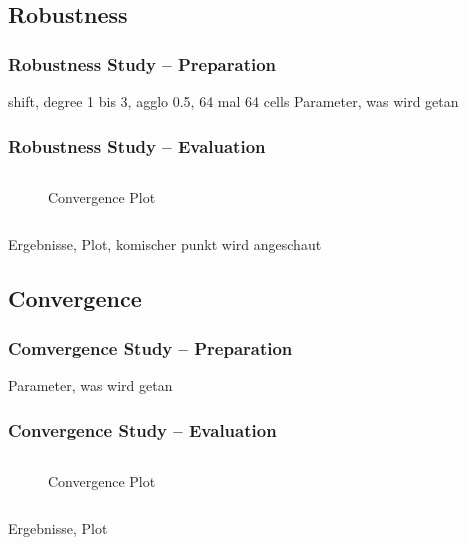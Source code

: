 	\subsection{Robustness}
	\begin{frame}
		\frametitle{Robustness Study -- Preparation}
		shift, degree 1 bis 3, agglo 0.5, 64 mal 64 cells
		Parameter, was wird getan
	\end{frame}
	\begin{frame}
		\frametitle{Robustness Study -- Evaluation}
		\begin{columns}[t]
	\column[]{4cm}
	\column[]{8cm}
			\begin{figure}[htp]	
				\vspace{-1cm}
				\centering
				
				\caption{Convergence Plot}
				\label{shifterror}
			\end{figure}
		\end{columns}
		Ergebnisse, Plot, komischer punkt wird angeschaut
	\end{frame}
	\subsection{Convergence}
	\begin{frame}
		\frametitle{Comvergence Study -- Preparation}
		Parameter, was wird getan
	\end{frame}
	\begin{frame}
		\frametitle{Convergence Study -- Evaluation}
		\begin{columns}[t]
			\column[]{4cm}
			\column[]{8cm}
		\begin{figure}[htp]
			\vspace{-1cm}
			\centering		
			
			\caption{Convergence Plot}
			\label{mesherror}
		\end{figure}
		\end{columns}
		Ergebnisse, Plot
	\end{frame}